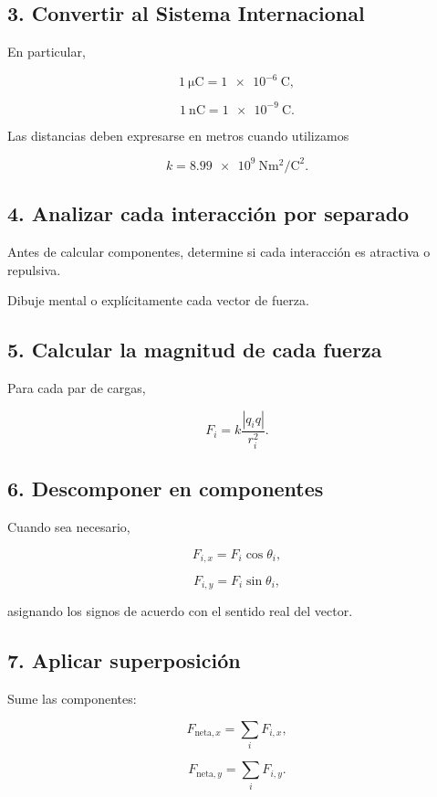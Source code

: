 \subsection{3. Convertir al Sistema Internacional}

En particular,

\[
\SI{1}{\micro\coulomb}
=
\SI{1e-6}{\coulomb},
\]

\[
\SI{1}{\nano\coulomb}
=
\SI{1e-9}{\coulomb}.
\]

Las distancias deben expresarse en metros cuando utilizamos

\[
k
=
\SI{8.99e9}{\newton\metre\squared\per\coulomb\squared}.
\]

\subsection{4. Analizar cada interacción por separado}

Antes de calcular componentes, determine si cada interacción es atractiva o
repulsiva.

Dibuje mental o explícitamente cada vector de fuerza.

\subsection{5. Calcular la magnitud de cada fuerza}

Para cada par de cargas,

\[
F_i
=
k
\frac{|q_iq|}{r_i^2}.
\]

\subsection{6. Descomponer en componentes}

Cuando sea necesario,

\[
F_{i,x}
=
F_i\cos\theta_i,
\]

\[
F_{i,y}
=
F_i\sin\theta_i,
\]

asignando los signos de acuerdo con el sentido real del vector.

\subsection{7. Aplicar superposición}

Sume las componentes:

\[
F_{\text{neta},x}
=
\sum_i F_{i,x},
\]

\[
F_{\text{neta},y}
=
\sum_i F_{i,y}.
\]

